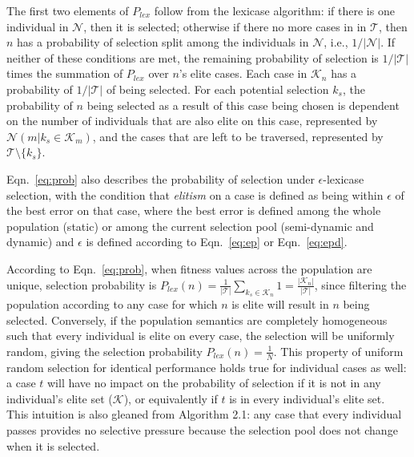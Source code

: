 \documentclass[twoside]{article}
\begin{document}
The first two elements of $P_{lex}$ follow from the lexicase algorithm: if there is one individual in $\mathcal{N}$, then it is selected; otherwise if there no more cases in in $\mathcal{T}$, then $n$ has a probability of selection split among the individuals in $\mathcal{N}$, i.e.,  $1/|\mathcal{N}|$. If neither of these conditions are met, the remaining probability of selection is $1/|\mathcal{T}|$ times the summation of $P_{lex}$ over $n$'s elite cases. Each case in $\mathcal{K}_n$ has a probability of $1/|\mathcal{T}|$ of being selected. For each potential selection $k_s$, the probability of $n$ being selected as a result of this case being chosen is dependent on the number of individuals that are also elite on this case, represented by $\mathcal{N}(m|k_s \in \mathcal{K}_m)$, and the cases that are left to be traversed, represented by $\mathcal{T} \setminus \{k_s\}$. 

Eqn.~\ref{eq:prob} also describes the probability of selection under $\epsilon$-lexicase selection, with the condition that {\it elitism} on a case is defined as being within $\epsilon$ of the best error on that case, where the best error is defined among the whole population (static) or among the current selection pool (semi-dynamic and dynamic) and $\epsilon$ is defined according to Eqn.~\ref{eq:ep} or Eqn.~\ref{eq:epd}. 

According to Eqn.~\ref{eq:prob}, when fitness values across the population are unique, selection probability is $P_{lex}(n) = \frac{1}{|\mathcal{T}|} \sum_{k_s \in \mathcal{K}_n} 1 = \frac{|\mathcal{K}_n|}{|\mathcal{T}|}$, since filtering the population according to any case for which $n$ is elite will result in $n$ being selected. Conversely, if the population semantics are completely homogeneous such that every individual is elite on every case, the selection will be uniformly random, giving the selection probability $P_{lex}(n) = \frac{1}{N}$. This property of uniform random selection for identical performance holds true for individual cases as well: a case $t$ will have no impact on the probability of selection if it is not in any individual's elite set ($\mathcal{K}$), or equivalently if $t$ is in every individual's elite set. This intuition is also gleaned from Algorithm 2.1: any case that every individual passes provides no selective pressure because the selection pool does not change when it is selected.
\end{document}
